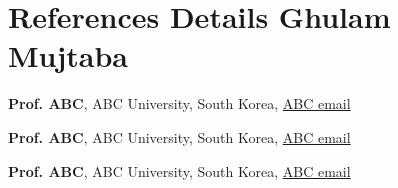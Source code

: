 \vspace{1.0cm}

\section*{\centering References Details \hfill Ghulam Mujtaba \hfill\hspace*{\fill}\monthYear}
\vspace*{5pt}

\textbf{Prof. ABC}, ABC University, South Korea, \underline{ABC email}


\vspace*{7pt}


\textbf{Prof. ABC}, ABC University, South Korea, \underline{ABC email}

\vspace*{7pt}


\textbf{Prof. ABC}, ABC University, South Korea, \underline{ABC email}

